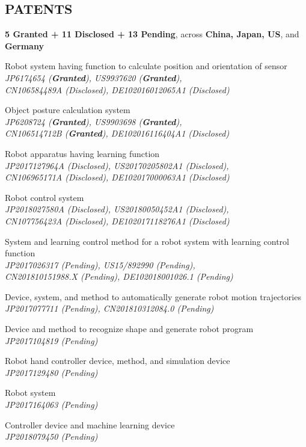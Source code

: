\documentclass[UTF8,nofonts]{res}
\begin{document}
\begin{resume}
\section{PATENTS}
\vspace{0.1in}
\textbf{5 Granted + 11 Disclosed + 13 Pending}, across \textbf{China, Japan, US}, and \textbf{Germany}
\begin{etaremune}
	\item Robot system having function to calculate position and orientation of sensor {\it \\JP6174654 ({\bf Granted}), US9937620 ({\bf Granted}), \\CN106584489A (Disclosed), DE102016012065A1 (Disclosed)}
	\item Object posture calculation system {\it \\JP6208724 ({\bf Granted}), US9903698 ({\bf Granted}), \\CN106514712B ({\bf Granted}), DE102016116404A1 (Disclosed)}
	\item Robot apparatus having learning function {\it \\JP2017127964A (Disclosed), US20170205802A1 (Disclosed), \\CN106965171A (Disclosed), DE102017000063A1 (Disclosed)}
	\item Robot control system {\it \\JP2018027580A (Disclosed), US20180050452A1 (Disclosed), \\CN107756423A (Disclosed), DE102017118276A1 (Disclosed)}
	\item System and learning control method for a robot system with learning control function {\it \\JP2017026317 (Pending), US15/892990 (Pending), \\CN201810151988.X (Pending), DE102018001026.1 (Pending)}
	\item Device, system, and method to automatically generate robot motion trajectories {\it \\JP2017077711 (Pending), CN201810312084.0 (Pending)}
	\item Device and method to recognize shape and generate robot program {\it \\JP2017104819 (Pending)}
	\item Robot hand controller device, method, and simulation device {\it \\JP2017129480 (Pending)}
	\item Robot system {\it \\JP2017164063 (Pending)}
	\item Controller device and machine learning device {\it \\JP2018079450 (Pending)}

\end{etaremune}
\end{resume}
\end{document}
